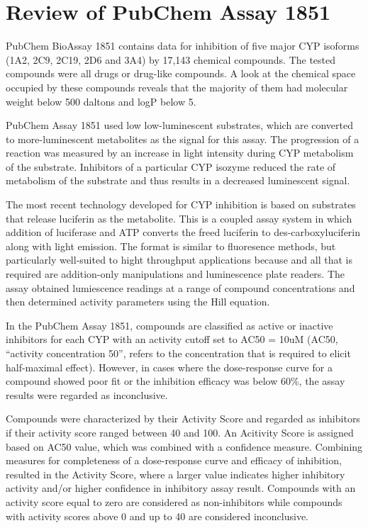 \section{Review of PubChem Assay 1851}
  

PubChem BioAssay 1851 contains data for inhibition of five major CYP isoforms (1A2, 2C9, 2C19, 2D6 and 3A4) by 17,143 chemical compounds. \cite{Veith2009} The tested compounds were all drugs or drug-like compounds. A look at the chemical space occupied by these compounds reveals that the majority of them had molecular weight below 500 daltons and logP below 5. \cite{Lapins2013}

PubChem Assay 1851 used low low-luminescent substrates, which are converted to more-luminescent metabolites as the signal for this assay. The progression of a reaction was measured by an increase in light intensity during CYP metabolism of the substrate. Inhibitors of a particular CYP isozyme reduced the rate of metabolism of the substrate and thus results in a decreased luminescent signal. \cite{Zlokarnik2005}

The most recent technology developed for CYP inhibition is based on substrates that release luciferin as the metabolite. This is a coupled assay system in which addition of luciferase and ATP converts the freed luciferin to des-carboxyluciferin along with light emission. The format is similar to fluoresence methods, but particularly well-suited to hight throughput applications because and all that is required are addition-only manipulations and luminescence plate readers. \cite{Zlokarnik2005} The assay obtained lumiescence readings at a range of compound concentrations and then determined activity parameters using the Hill equation.

In the PubChem Assay 1851, compounds are classified as active or inactive inhibitors for each CYP with an activity cutoff set to AC50 = 10uM (AC50, “activity concentration 50”, refers to the concentration that is required to elicit half-maximal effect). However, in cases where the dose-response curve for a compound showed poor fit or the inhibition efficacy was below 60\%, the assay results were regarded as inconclusive. \cite{Lapins2013}

Compounds were characterized by their Activity Score and regarded as inhibitors if their activity score ranged between 40 and 100. An Acitivity Score is assigned based on AC50 value, which was combined with a confidence measure. Combining measures for completeness of a dose-response curve and efficacy of inhibition, resulted in the Activity Score, where a larger value indicates higher inhibitory activity and/or higher confidence in inhibitory assay result. Compounds with an activity score equal to zero are considered as non-inhibitors while compounds with activity scores above 0 and up to 40 are considered inconclusive. \cite{Lapins2013}

